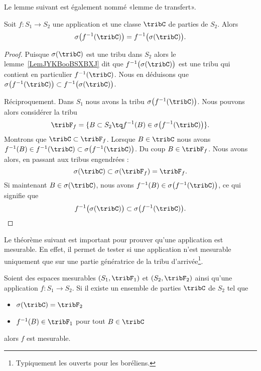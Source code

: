 Le lemme suivant est également nommé «lemme de transfert».
\begin{lemma}       \label{LemOQTBooWGYuDU}
    Soit \( f\colon S_1\to S_2\) une application et une classe \( \tribC\) de parties de \( S_2\). Alors
    \begin{equation}
        \sigma\big( f^{-1}(\tribC) \big)=f^{-1}\big( \sigma(\tribC) \big).
    \end{equation}
\end{lemma}

\begin{proof}
    Puisque \( \sigma(\tribC)\) est une tribu dans \( S_2\) alors le lemme~\ref{LemJYKBooBSXBXJ} dit que \( f^{-1}\big( \sigma(\tribC) \big)\) est une tribu qui contient en particulier \(  f^{-1}(\tribC) \). Nous en déduisons que \( \sigma\big( f^{-1}(\tribC) \big)\subset f^{-1}\big( \sigma(\tribC) \big)\).

    Réciproquement. Dans \( S_1\) nous avons la tribu \( \sigma\big( f^{-1}(\tribC) \big)\). Nous pouvons alors considérer la tribu
    \begin{equation}
        \tribF_f=\{ B\subset S_2\tq f^{-1}(B)\in\sigma\big( f^{-1}(\tribC) \big) \}.
    \end{equation}
    Montrons que \( \tribC\subset \tribF_f\). Lorsque \( B\in \tribC\) nous avons \( f^{-1}(B)\in f^{-1}(\tribC)\subset\sigma\big( f^{-1}(\tribC) \big)\). Du coup \( B\in \tribF_f\). Nous avons alors, en passant aux tribus engendrées :
    \begin{equation}
        \sigma(\tribC)\subset\sigma(\tribF_f)=\tribF_f.
    \end{equation}
    Si maintenant \( B\in\sigma(\tribC)\), nous avons \( f^{-1}(B)\in \sigma\big( f^{-1}(\tribC) \big)\), ce qui signifie que
    \begin{equation}
        f^{-1}\big( \sigma(\tribC) \big)\subset\sigma\big( f^{-1}(\tribC) \big).
    \end{equation}
\end{proof}

Le théorème suivant est important pour prouver qu'une application est mesurable. En effet, il permet de tester si une application n'est mesurable uniquement que sur une partie génératrice de la tribu d'arrivée\footnote{Typiquement les ouverts pour les boréliens.}.
\begin{theorem}     \label{ThoECVAooDUxZrE}
    Soient des espaces mesurables \( ( S_1,\tribF_1 )\) et \( (S_2,\tribF_2)\) ainsi qu'une application \( f\colon S_1\to S_2\). Si il existe un ensemble de parties \( \tribC\) de \( S_2\) tel que
    \begin{itemize}
        \item \( \sigma(\tribC)=\tribF_2\)
        \item \( f^{-1}(B) \in \tribF_1 \) pour tout \( B\in \tribC\)
    \end{itemize}
    alors \( f\) est mesurable.
\end{theorem}

